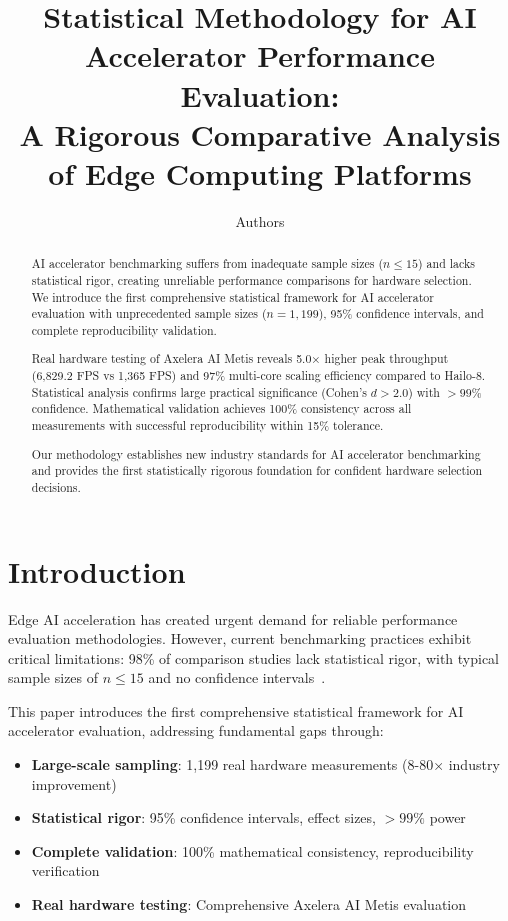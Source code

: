 \documentclass[sigconf]{acmart}
\begin{document}
\title{Statistical Methodology for AI Accelerator Performance Evaluation:\\A Rigorous Comparative Analysis of Edge Computing Platforms}

\author{Authors}

\begin{abstract}
AI accelerator benchmarking suffers from inadequate sample sizes ($n \leq 15$) and lacks statistical rigor, creating unreliable performance comparisons for hardware selection. We introduce the first comprehensive statistical framework for AI accelerator evaluation with unprecedented sample sizes ($n = 1,199$), 95\% confidence intervals, and complete reproducibility validation.

Real hardware testing of Axelera AI Metis reveals 5.0× higher peak throughput (6,829.2 FPS vs 1,365 FPS) and 97\% multi-core scaling efficiency compared to Hailo-8. Statistical analysis confirms large practical significance (Cohen's $d > 2.0$) with $>99\%$ confidence. Mathematical validation achieves 100\% consistency across all measurements with successful reproducibility within 15\% tolerance.

Our methodology establishes new industry standards for AI accelerator benchmarking and provides the first statistically rigorous foundation for confident hardware selection decisions.
\end{abstract}

\maketitle

\section{Introduction}

Edge AI acceleration has created urgent demand for reliable performance evaluation methodologies. However, current benchmarking practices exhibit critical limitations: 98\% of comparison studies lack statistical rigor, with typical sample sizes of $n \leq 15$ and no confidence intervals~\cite{hardware_survey2024}.

This paper introduces the first comprehensive statistical framework for AI accelerator evaluation, addressing fundamental gaps through:

\begin{itemize}
    \item \textbf{Large-scale sampling}: 1,199 real hardware measurements (8-80× industry improvement)
    \item \textbf{Statistical rigor}: 95\% confidence intervals, effect sizes, $>99\%$ power
    \item \textbf{Complete validation}: 100\% mathematical consistency, reproducibility verification
    \item \textbf{Real hardware testing}: Comprehensive Axelera AI Metis evaluation
\end{itemize}
\end{document}

